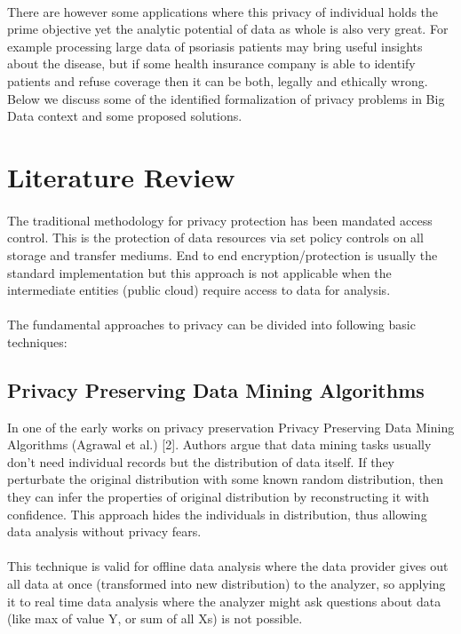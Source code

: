 \documentclass{report}
\begin{document}
\paragraph{}
There are however some applications where this privacy of individual holds the prime objective yet the analytic potential of data as whole is also very great. For example processing large data of psoriasis patients may bring useful insights about the disease, but if some health insurance company is able to identify patients and refuse coverage then it can be both, legally and ethically wrong. 
Below we discuss some of the identified formalization of privacy problems in Big Data context and some proposed solutions.

\section{Literature Review}
\paragraph{}
The traditional methodology for privacy protection has been mandated access control. This is the protection of data resources via set policy controls on all storage and transfer mediums. End to end encryption/protection is usually the standard implementation but this approach is not applicable when the intermediate entities (public cloud) require access to data for analysis.
\paragraph{}
The fundamental approaches to privacy can be divided into following basic techniques:
\subsection{Privacy Preserving Data Mining Algorithms}
In one of the early works on privacy preservation Privacy Preserving Data Mining Algorithms (Agrawal et al.) [2]. Authors argue that data mining tasks usually don’t need individual records but the distribution of data itself. If they perturbate the original distribution with some known random distribution, then they can infer the properties of original distribution by reconstructing it with confidence. This approach hides the individuals in distribution, thus allowing data analysis without privacy fears.
\paragraph{}
This technique is valid for offline data analysis where the data provider gives out all data at once (transformed into new distribution) to the analyzer, so applying it to real time data analysis where the analyzer might ask questions about data (like max of value Y, or sum of all Xs) is not possible.
\end{document}
